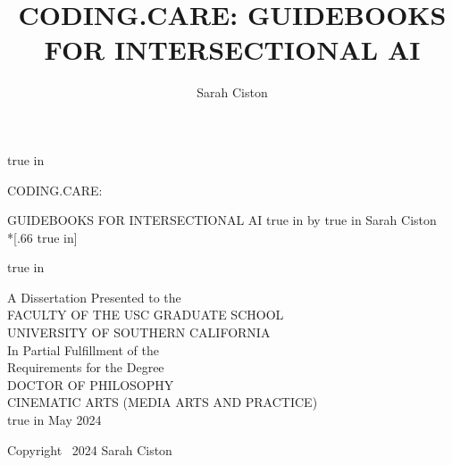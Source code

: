 \documentclass[11pt,oneside]{scrbook} %
\title{CODING.CARE: GUIDEBOOKS FOR INTERSECTIONAL AI}
\author{Sarah Ciston}
\begin{document}
{}%
\pagestyle{empty}%
\begin{singlespace}%
    \hypersetup{hidelinks}
  \large  %
    \setcounter{page}{0}%
    \null
     true in
    \begin{center} 
    \begin{doublespace}
        CODING.CARE: \par
        GUIDEBOOKS FOR INTERSECTIONAL AI
       true in
      by%
       true in
      Sarah Ciston\\*[.66 true in]%
      \par
       true in
    \end{doublespace}
      A Dissertation Presented to the\\%
      FACULTY OF THE USC GRADUATE SCHOOL\\%
      UNIVERSITY OF SOUTHERN CALIFORNIA\\%
      In Partial Fulfillment of the\\%
      Requirements for the Degree\\%
      DOCTOR OF PHILOSOPHY\\%
      CINEMATIC ARTS (MEDIA ARTS AND PRACTICE)\\%
       true in
      May 2024%
    \end{center}%
    \par
    \vfill
          \noindent Copyright~ 2024 \hfill Sarah Ciston
    \end{singlespace}
    \pagestyle{plain}%
\end{document}
